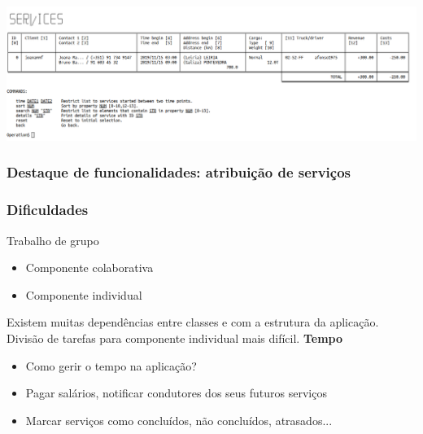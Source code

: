 \documentclass{beamer}
\def\\{}
\begin{document}
\begin{frame}
\begin{center} \includegraphics[scale=0.26]{feature1.png} \end{center}
\end{frame}

\begin{frame}
\frametitle{Destaque de funcionalidades: atribuição de serviços}
\begin{center}
\scalebox{.85}{

}
\end{center}
\end{frame}

\begin{frame}
\frametitle{Dificuldades}
Trabalho de grupo
\begin{itemize}
	\item Componente colaborativa
	\item Componente individual
\end{itemize}
Existem muitas dependências entre classes e com a estrutura da aplicação.\\
Divisão de tarefas para componente individual mais difícil.\\
\textbf{Tempo}
\begin{itemize}
	\item Como gerir o tempo na aplicação?
	\item Pagar salários, notificar condutores dos seus futuros serviços
	\item Marcar serviços como concluídos, não concluídos, atrasados...
\end{itemize}
\end{frame}
\end{document}
